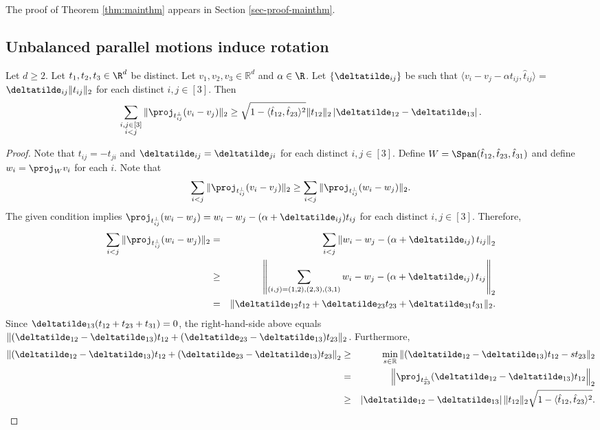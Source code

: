 The proof of Theorem \ref{thm:mainthm} appears in Section \ref{sec-proof-mainthm}.


\subsection{Unbalanced parallel motions induce rotation} \label{sec-unbalanced-motions}


\begin{lemma} \label{lem:rigidity1}
Let $d\ge2$. Let $t_{1},t_{2},t_{3} \in \R^d$ be distinct.  Let $v_{1},v_{2},v_{3}\in\mathbb{R}^{d}$ and $\alpha \in \R$.   Let $\{\deltatilde_{ij}\}$ be such that  ${\langle v_{i}-v_{j}-\alpha t_{ij},\hat{t}_{ij}\rangle=}$ $\deltatilde_{ij}\|t_{ij}\|_2$ for each distinct $i,j\in[3]$. Then
\[
	\sum_{\substack{i,j\in[3]\\i<j}} 
	\|\proj_{t_{ij}^{\perp}}(v_{i}-v_{j})\|_2
	\ge \sqrt{1-\langle \hat{t}_{12},\hat{t}_{23}\rangle^{2}}\|t_{12}\|_2\left|\deltatilde_{12}-\deltatilde_{13}\right|.
\]
\end{lemma}
\begin{proof}
Note that $t_{ij}=-t_{ji}$ and $\deltatilde_{ij}=\deltatilde_{ji}$ for each
distinct $i,j\in[3]$. Define $W=\Span(\hat{t}_{12},\hat{t}_{23},\hat{t}_{31})$
and define $w_{i}=\proj_{W}v_{i}$ for each $i$. Note that
\[
\sum_{i<j}\|\proj_{t_{ij}^{\perp}}(v_{i}-v_{j})\|_2\ge\sum_{i<j}\|\proj_{t_{ij}^{\perp}}(w_{i}-w_{j})\|_2.
\]
The given condition implies $\proj_{t_{ij}^{\perp}}(w_{i}-w_{j})=w_{i}-w_{j}-(\alpha+\deltatilde_{ij})t_{ij}$
for each distinct $i,j \in [3]$. Therefore,
\begin{eqnarray*}
\sum_{i<j}\|\proj_{t_{ij}^{\perp}}(w_{i}-w_{j})\|_2 & = & \sum_{i<j}\left\| w_{i}-w_{j}-\left(\alpha+\deltatilde_{ij}\right)t_{ij}\right\|_2 \\
 & \ge & \left\| \sum_{(i,j)=(1,2),(2,3),(3,1)}w_{i}-w_{j}-\left(\alpha+\deltatilde_{ij}\right)t_{ij}\right\|_2 \\
 & = & \|\deltatilde_{12}t_{12}+\deltatilde_{23}t_{23}+\deltatilde_{31}t_{31}\|_2.
\end{eqnarray*}
Since $\deltatilde_{13}(t_{12}+t_{23}+t_{31})=0$, the right-hand-side
above equals $\|(\deltatilde_{12}-\deltatilde_{13})t_{12}+(\deltatilde_{23}-\deltatilde_{13})t_{23}\|_2$.
Furthermore,
\begin{eqnarray*}
\left\| (\deltatilde_{12}-\deltatilde_{13})t_{12}+(\deltatilde_{23}-\deltatilde_{13})t_{23}\right\|_2  & \ge & \min_{s\in\mathbb{R}}\|(\deltatilde_{12}-\deltatilde_{13})t_{12}-st_{23}\|_2\\
 & = & \left\| \proj_{t_{23}^{\perp}}(\deltatilde_{12}-\deltatilde_{13})t_{12}\right\|_2 \\
 & \ge & \left|\deltatilde_{12}-\deltatilde_{13}\right|\|t_{12}\|_2\sqrt{1-\langle 
 \hat{t}_{12},\hat{t}_{23}\rangle^{2}}.\qedhere
\end{eqnarray*}
\end{proof}


